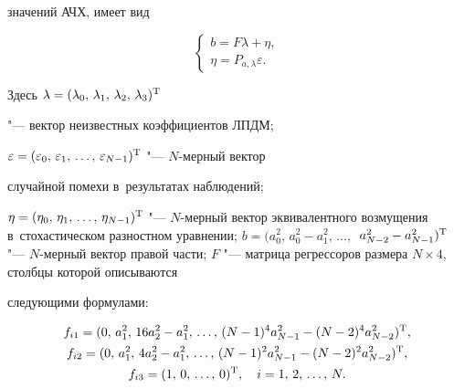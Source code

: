 значений АЧХ, имеет вид


\begin{equation}


\label{popova:eq9}


\left\{ {\begin{array}{l}


 b = F\lambda + \eta , \\ 


 \eta = P_{a,\lambda } \varepsilon . 


 \end{array}} \right.


\end{equation}


Здесь $\lambda = (\lambda _0 ,\,\lambda _1 ,\,\lambda _2 ,\,\lambda _3 )^{\rm T}$ 


"--- вектор неизвестных коэффициентов ЛПДМ; 


$\varepsilon = (\varepsilon _0,\,\varepsilon _1,\, \dots,\, \varepsilon _{N - 1} )^{\rm T}$ "--- $N$-мерный вектор 


случайной помехи в~результатах наблюдений; 


$\eta = (\eta _0 ,\,\eta _1 ,\, \dots,\,\eta _{N - 1} )^{\rm T}$ "--- $N$-мерный вектор эквивалентного возмущения в~стохастическом разностном уравнении; $b = (a_0^2,\, a_0^2 - a_1^2,\, \dots,$ $ \, a_{N - 2}^2 - a_{N - 1}^2 )^{\rm T}$ "--- $N$-мерный вектор правой части; $F$ "--- матрица регрессоров размера $N\times 4$, столбцы которой описываются 


следующими формулами:


\begin{gather*}


f_{i1} = (0,\,a_1^2 ,\,16a_2^2 - a_1^2 ,\, \dots,\,(N - 1)^4a_{N - 1}^2 - (N - 2)^4a_{N - 2}^2 )^{\rm T},


\\


f_{i2} = (0,\,a_1^2 ,\,4a_2^2 - a_1^2 ,\, \dots,\,(N - 1)^2a_{N - 1}^2 - (N - 2)^2a_{N - 2}^2 )^{\rm T},


\\


f_{i3} = (1,\,0,\,\dots,\,0)^{\rm T},\quad i = 1,\, 2,\, \dots,\,  N.


\end{gather*}











